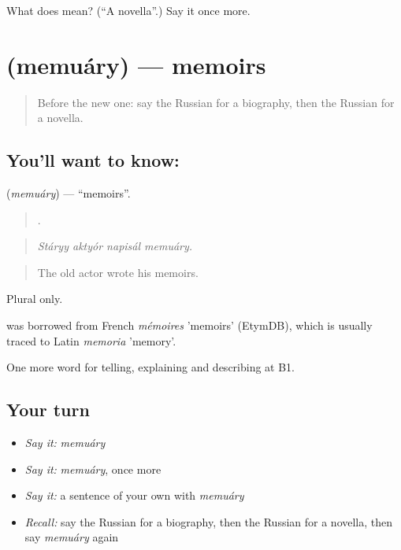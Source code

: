 \begin{tcolorbox}[breakable,colback=teal!4,colframe=teal!35!black,title={Before you move on}]
What does  mean? (\textquotedblleft{}A novella\textquotedblright{}.) Say it once more.
\end{tcolorbox}
\section[\texorpdfstring{\ru{мемуары} (memuáry)}{мемуары (memuáry)}]{ (memuáry) — memoirs}

\label{lesson:RU-C524-memuary}



\begin{quote}
Before the new one: say the Russian for a biography, then the Russian for a novella.
\end{quote}

\subsection*{You'll want to know: }
\textbf{} (\emph{memuáry}) — \textquotedblleft{}memoirs\textquotedblright{}.

\begin{quote}
   .
\end{quote}

\begin{quote}
\emph{Stáryy aktyór napisál memuáry.}
\end{quote}

\begin{quote}
The old actor wrote his memoirs.
\end{quote}

Plural only.

\begin{cousinweb}
\emph{} was borrowed from French \emph{mémoires} 'memoirs' (EtymDB), which is usually traced to Latin \emph{memoria} 'memory'.
\end{cousinweb}

\begin{grammarlens}[title={What you've built}]
One more word for telling, explaining and describing at B1.
\end{grammarlens}

\subsection*{Your turn}
\begin{itemize}
\raggedright
  \item \emph{Say it:} \emph{memuáry}
  \item \emph{Say it:} \emph{memuáry}, once more
  \item \emph{Say it:} a sentence of your own with \emph{memuáry}
  \item \emph{Recall:} say the Russian for a biography, then the Russian for a novella, then say \emph{memuáry} again
\end{itemize}


